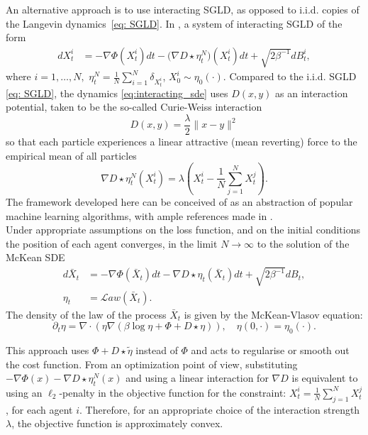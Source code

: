 \documentclass{article}
\theoremstyle{mystyle}
\begin{document}
An alternative approach is to use interacting SGLD, as opposed to
i.i.d. copies of the Langevin dynamics~\ref{eq: SGLD}. In \cite{kantas2019sharpflatshallowweakly}, a system of interacting SGLD of the form 
\begin{align}
dX_{t}^{i} & =-\nabla\Phi(X_{t}^{i})dt-\big(\nabla D\star\eta_{t}^{N}\big)(X_{t}^{i})dt+\sqrt{2\beta^{-1}}dB_{t}^{i},\label{eq:interacting_sde}
\end{align}
where $i=1,\ldots,N,$ $\eta_{t}^{N}=\frac{1}{N}\sum_{i=1}^{N}\delta_{X_{t}^{i}}$,
$X_{0}^{i}\sim\eta_{0}(\cdot)$. Compared to the i.i.d. SGLD \ref{eq: SGLD},
the dynamics \ref{eq:interacting_sde} uses $D(x,y)$ as an interaction
potential, taken to be the so-called Curie-Weiss interaction
\begin{equation}
D(x,y)=\frac{\lambda}{2}\|x-y\|^{2}\label{e:inter}
\end{equation}
so that each particle experiences a linear attractive (mean reverting)
force to the empirical mean of all particles 
\[
\nabla D\star\eta_{t}^{N}(X_{t}^{i})=\lambda\left(X_{t}^{i}-\frac{1}{N}\sum_{j=1}^{N}X_{t}^{j}\right).
\]
The framework developed here can be conceived of as an abstraction of popular
machine learning algorithms, with ample references made in \cite[p. 4]{kantas2019sharpflatshallowweakly}.\\

Under appropriate assumptions
on the loss function, and on the initial conditions the position of
each agent converges, in the limit $N\rightarrow\infty$ to the solution
of the McKean SDE 
\begin{align*}
d\bar{X}_{t} & =-\nabla\Phi(\bar{X}_{t})dt-\nabla D\star\eta_{t}(\bar{X}_{t})dt+\sqrt{2\beta^{-1}}dB_{t},\\
\eta_{t} & =\mathcal{L}aw\left(\bar{X}_{t}\right).
\end{align*}
The density of the law of the process $\bar{X}_{t}$ is given by the
McKean-Vlasov equation: 
\begin{equation}
\partial_{t}\eta=\nabla\cdot\left(\eta\nabla\left(\beta\log\eta+\Phi+D\star\eta\right)\right),\quad\eta(0,\cdot)=\eta_{0}(\cdot).\label{e:mc-vl}
\end{equation}

This approach uses $\Phi+D\star\tilde{\eta}$ instead of $\Phi$ and acts to regularise
or smooth out the cost function. From an optimization point of view,
substituting $-\nabla\Phi(x)-\nabla D\star\eta_{t}^{N}(x)$ and using
a linear interaction for $\nabla D$ is equivalent to using an $\ell_{2}$-penalty
in the objective function for the constraint: $X_{t}^{i}=\frac{1}{N}\sum_{j=1}^{N}X_{t}^{j}$,
for each agent $i$. Therefore, for an appropriate choice of the interaction
strength $\lambda$, the objective function is approximately convex.
\end{document}
